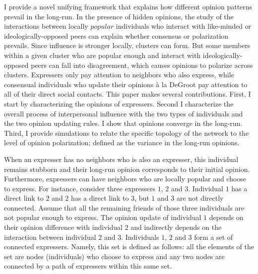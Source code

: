 \documentclass{article}
\begin{document}
I provide a novel unifying framework that explains how different opinion patterns prevail in the long-run. In the presence of hidden opinions, the study of the interactions between locally $popular$ individuals who interact with like-minded or ideologically-opposed peers can explain whether consensus or polarization prevails. Since influence is stronger locally, clusters can form. But some members within a given cluster who are popular enough and interact with ideologically-opposed peers can fall into disagreement, which causes opinions to polarize across clusters. Expressers only pay attention to neighbors who also express, while consensual individuals who update their opinions \`{a} la DeGroot pay attention to all of their direct social contacts. This paper makes several contributions. First, I start by characterizing the opinions of expressers. Second I characterize the overall process of interpersonal influence with the two types of individuals and the two opinion updating rules. I show that opinions converge in the long-run. Third, I provide simulations to relate the specific topology of the network to the level of opinion polarization; defined as the variance in the long-run opinions. 

\bigskip

When an expresser has no neighbors who is also an expresser, this individual remains stubborn and their long-run opinion corresponds to their initial opinion. Furthermore, expressers can have neighbors who are locally popular and choose to express. For instance, consider three expressers $1$, $2$ and $3$. Individual $1$ has a direct link to $2$ and $2$ has a direct link to $3$, but $1$ and $3$ are not directly connected. Assume that all the remaining friends of those three individuals are not popular enough to express. The opinion update of individual $1$ depends on their opinion difference with individual $2$ and indirectly depends on the interaction between individual $2$ and $3$. Individuals $1$, $2$ and $3$ form a set of connected expressers. Namely, this set is defined as follows: all the elements of the set are nodes (individuals) who choose to express and any two nodes are connected by a path of expressers within this same set. 
\end{document}
